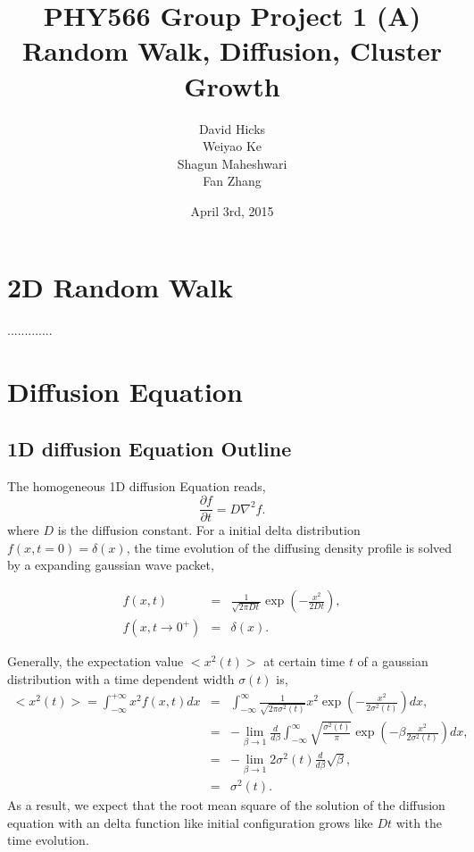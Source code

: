 \documentclass[a4paper,12pt]{article}
\begin{document}
\title{PHY566 Group Project 1 (A) \\ Random Walk, Diffusion, Cluster Growth}
\date{\small April 3rd, 2015}
\author{David Hicks\\ Weiyao Ke \\ Shagun Maheshwari \\ Fan Zhang}

\maketitle

\section{2D Random Walk}
.............


\section{Diffusion Equation}
\subsection{1D diffusion Equation Outline}
\indent
\indent The homogeneous 1D diffusion Equation reads,
\begin{equation}
	\frac{\partial f}{\partial t} = D \nabla^2 f.
\end{equation}
where $D$ is the diffusion constant. For a initial delta distribution $f(x, t = 0) = \delta(x)$, the time evolution of the diffusing density profile is solved by a expanding gaussian wave packet,

\begin{eqnarray*}
	f(x,t) &=& \frac{1}{\sqrt{2\pi D t}} \exp{(-\frac{x^2}{2Dt})}, \\
	f(x, t \rightarrow 0^+) &=& \delta(x).
\end{eqnarray*}

Generally, the expectation value $<x^2(t)>$ at certain time $t$ of a gaussian distribution with a time dependent width $\sigma(t)$ is,
\begin{eqnarray*}
	<x^2(t)> = \int_{-\infty}^{+\infty} x^2 f(x,t) dx &=&  \int_{-\infty}^{\infty}  \frac{1}{\sqrt{2\pi \sigma^2(t)}} x^2 \exp{(-\frac{x^2}{2\sigma^2(t)})} dx, \\
	& = & -\lim_{\beta\rightarrow 1}\frac{d}{d\beta}\int_{-\infty}^{\infty}  \sqrt{\frac{\sigma^2(t)}{\pi}} \exp{(-\beta \frac{x^2}{2\sigma^2(t)})} dx, \\
	& = & -\lim_{\beta\rightarrow 1} 2\sigma^2(t)\frac{d}{d\beta}\sqrt{\beta}, \\
	& = & \sigma^2(t). 
\end{eqnarray*}
As a result, we expect that the root mean square of the solution of the diffusion equation with an delta function like initial configuration grows like $Dt$ with the time evolution. 
\end{document}
